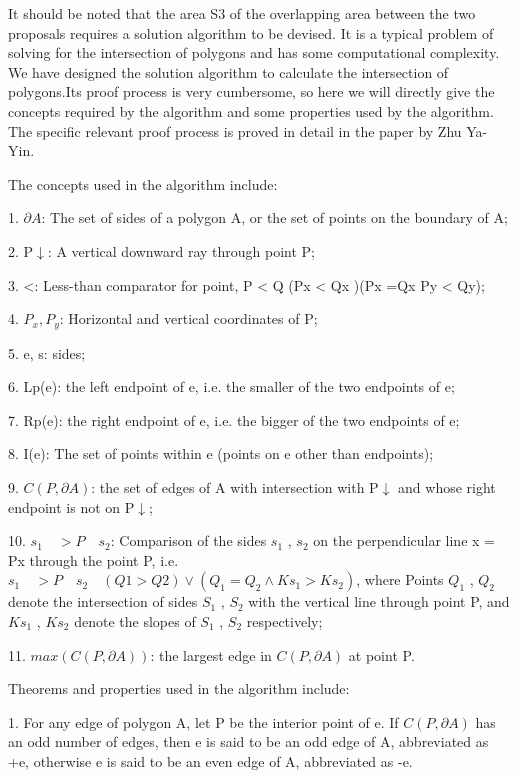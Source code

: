 It should be noted that the area S3 of the overlapping area between the two proposals requires a solution algorithm to be devised. It is a typical problem of solving for the intersection of polygons and has some computational complexity. We have designed the  solution algorithm to calculate the intersection of polygons.Its proof process is very cumbersome, so here we will directly give the concepts required by the algorithm and some properties used by the algorithm.
The specific relevant proof process is proved in detail in the paper by Zhu Ya-Yin\cite{bib10}.

The concepts used in the algorithm include:

1. $\partial A$: The set of sides of a polygon A, or the set of points on the boundary of A;

2. P$\downarrow$: A vertical downward ray through point P;

3. <: Less-than comparator for point, P < Q (Px < Qx )\vee (Px =Qx \wedge  Py < Qy);

4. $P_{x},P_{y}$: Horizontal and vertical coordinates of P;

5. e, s: sides;

6. Lp(e): the left endpoint of e, i.e. the smaller of the two endpoints of e;

7. Rp(e): the right endpoint of e, i.e. the bigger of the two endpoints of e;

8. I(e): The set of points within e (points on e other than endpoints);

9. $C(P , \partial A) $: the set of edges of A with intersection with P$\downarrow$ and whose right endpoint is not on P$\downarrow$;

10. $s_{1} \quad  >P \quad s_{2}$: Comparison of the sides $s_{1}$ , $s_{2}$ on the perpendicular line x = Px through the point P, i.e. $s_{1} \quad  >P \quad s_{2} \quad (Q1 >Q2)\vee  (Q_{1}  =Q_{2}  \wedge Ks_{1}  >Ks_{2} )$, where Points $Q_{1}$ , $Q_{2}$ denote the intersection of sides $S_{1}$ , $S_{2}$ with the vertical line through point P, and $Ks_{1}$ , $Ks_{2}$ denote the slopes of $S_{1}$ , $S_{2}$ respectively;  

11. $max(C(P , \partial A))$: the largest edge in $C(P , \partial A)$ at point P.

Theorems and properties used in the algorithm include:

1. For any edge of polygon A, let P be the interior point of e. If $C(P , \partial A)$ has an odd number of edges, then e is said to be an odd edge of A, abbreviated as +e, otherwise e is said to be an even edge of A, abbreviated as -e.

